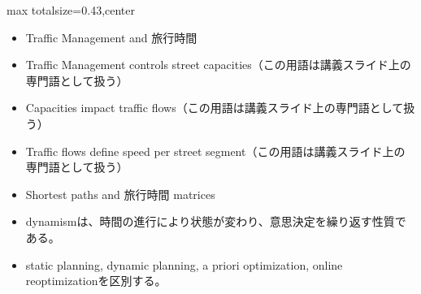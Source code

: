 \clearpage
{}
\begin{minipage}[t]{0.405\textwidth}
\begin{adjustbox}{max totalsize={\textwidth}{0.43\textheight},center}
\begin{minipage}{\textwidth}\scriptsize
{}\begin{itemize}
\item Traffic Management and 旅行時間
\item Traffic Management controls street capacities（この用語は講義スライド上の専門語として扱う）
\item Capacities impact traffic flows（この用語は講義スライド上の専門語として扱う）
\item Traffic flows define speed per street segment（この用語は講義スライド上の専門語として扱う）
\item Shortest paths and 旅行時間 matrices
\end{itemize}\begin{itemize}
\item dynamismは、時間の進行により状態が変わり、意思決定を繰り返す性質である。
\item static planning, dynamic planning, a priori optimization, online reoptimizationを区別する。
\end{itemize}
\end{minipage}
\end{adjustbox}
\end{minipage}\hfill
